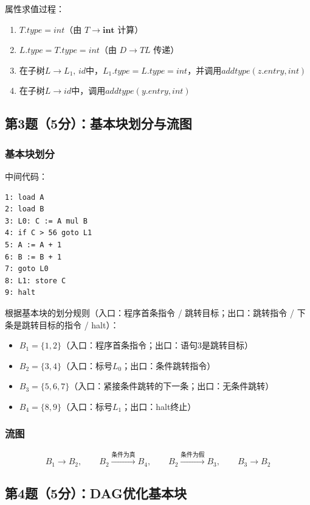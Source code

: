 \documentclass[12pt,a4paper,fontset=fandol]{ctexart}
\begin{document}
属性求值过程：
\begin{enumerate}[label=(\arabic*)]
    \item $T.\textit{type} = \textit{int}$（由 $T \to \textbf{int}$ 计算）
    \item $L.\textit{type} = T.\textit{type} = \textit{int}$（由 $D \to TL$ 传递）
    \item 在子树$L \to L_1,\,id$中，$L_1.\textit{type} = L.\textit{type} = \textit{int}$，并调用$\textit{addtype}(z.\textit{entry}, \textit{int})$
    \item 在子树$L \to id$中，调用$\textit{addtype}(y.\textit{entry}, \textit{int})$
\end{enumerate}

\subsection{第3题（5分）：基本块划分与流图}

\subsubsection*{基本块划分}

中间代码：
\begin{verbatim}
1: load A
2: load B
3: L0: C := A mul B
4: if C > 56 goto L1
5: A := A + 1
6: B := B + 1
7: goto L0
8: L1: store C
9: halt
\end{verbatim}

根据基本块的划分规则（入口：程序首条指令 / 跳转目标；出口：跳转指令 / 下条是跳转目标的指令 / halt）：
\begin{itemize}
    \item $B_1 = \{1, 2\}$（入口：程序首条指令；出口：语句3是跳转目标）
    \item $B_2 = \{3, 4\}$（入口：标号$L_0$；出口：条件跳转指令）
    \item $B_3 = \{5, 6, 7\}$（入口：紧接条件跳转的下一条；出口：无条件跳转）
    \item $B_4 = \{8, 9\}$（入口：标号$L_1$；出口：halt终止）
\end{itemize}

\subsubsection*{流图}
\[
B_1 \longrightarrow B_2,\qquad
B_2 \xrightarrow{\text{条件为真}} B_4,\qquad
B_2 \xrightarrow{\text{条件为假}} B_3,\qquad
B_3 \longrightarrow B_2
\]

\subsection{第4题（5分）：DAG优化基本块}
\end{document}
